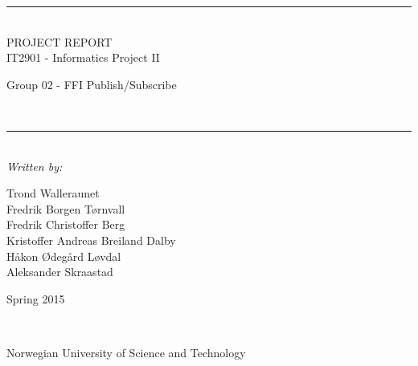 \thispagestyle{empty}
\begin{center}
\noindent\rule{\textwidth}{0.5pt}
\\[1pc]
\Huge{PROJECT REPORT}
\\[1pc]
\large{IT2901 - Informatics Project II}
\\[1pc]
\begin{small}
\begin{bf}Group 02 - FFI Publish/Subscribe\end{bf}
\end{small}
\\[1pc]
\noindent\rule{\textwidth}{0.5pt}
\\[5pc]
\textit{Written by:}
\\[1pc]
\begin{small}
Trond Walleraunet\\Fredrik Borgen Tørnvall\\Fredrik Christoffer Berg\\Kristoffer Andreas Breiland Dalby\\Håkon Ødegård Løvdal\\Aleksander Skraastad \\[7pc]
\end{small}
\begin{bf}
Spring 2015
\end{bf}
\\[8pc]

\noindent{}

\begin{small}Norwegian University of Science and Technology\end{small}

\end{center}

\pagebreak
